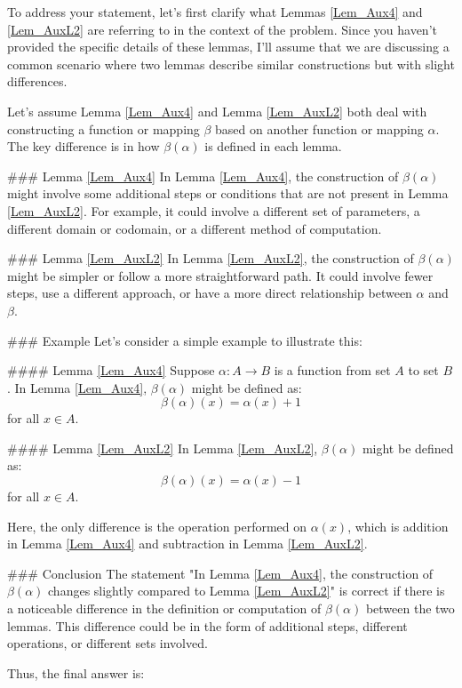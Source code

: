 To address your statement, let's first clarify what Lemmas \ref{Lem_Aux4} and \ref{Lem_AuxL2} are referring to in the context of the problem. Since you haven't provided the specific details of these lemmas, I'll assume that we are discussing a common scenario where two lemmas describe similar constructions but with slight differences.

Let's assume Lemma \ref{Lem_Aux4} and Lemma \ref{Lem_AuxL2} both deal with constructing a function or mapping \(\beta\) based on another function or mapping \(\alpha\). The key difference is in how \(\beta(\alpha)\) is defined in each lemma.

### Lemma \ref{Lem_Aux4}
In Lemma \ref{Lem_Aux4}, the construction of \(\beta(\alpha)\) might involve some additional steps or conditions that are not present in Lemma \ref{Lem_AuxL2}. For example, it could involve a different set of parameters, a different domain or codomain, or a different method of computation.

### Lemma \ref{Lem_AuxL2}
In Lemma \ref{Lem_AuxL2}, the construction of \(\beta(\alpha)\) might be simpler or follow a more straightforward path. It could involve fewer steps, use a different approach, or have a more direct relationship between \(\alpha\) and \(\beta\).

### Example
Let's consider a simple example to illustrate this:

#### Lemma \ref{Lem_Aux4}
Suppose \(\alpha: A \to B\) is a function from set \(A\) to set \(B\). In Lemma \ref{Lem_Aux4}, \(\beta(\alpha)\) might be defined as:
\[
\beta(\alpha)(x) = \alpha(x) + 1
\]
for all \(x \in A\).

#### Lemma \ref{Lem_AuxL2}
In Lemma \ref{Lem_AuxL2}, \(\beta(\alpha)\) might be defined as:
\[
\beta(\alpha)(x) = \alpha(x) - 1
\]
for all \(x \in A\).

Here, the only difference is the operation performed on \(\alpha(x)\), which is addition in Lemma \ref{Lem_Aux4} and subtraction in Lemma \ref{Lem_AuxL2}.

### Conclusion
The statement "In Lemma \ref{Lem_Aux4}, the construction of \(\beta(\alpha)\) changes slightly compared to Lemma \ref{Lem_AuxL2}" is correct if there is a noticeable difference in the definition or computation of \(\beta(\alpha)\) between the two lemmas. This difference could be in the form of additional steps, different operations, or different sets involved.

Thus, the final answer is:
